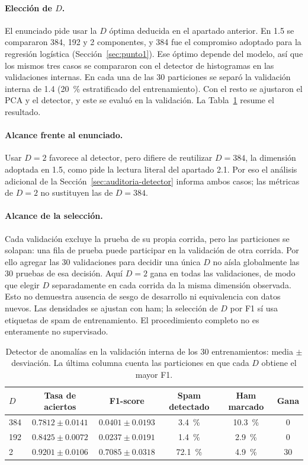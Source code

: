 \paragraph{Elección de $D$.} El enunciado pide usar la $D$ óptima deducida en
el apartado anterior. En 1.5 se compararon 384, 192 y 2 componentes, y 384
fue el compromiso adoptado para la regresión logística (Sección~\ref{sec:punto1}). Ese
óptimo depende del modelo, así que los mismos tres casos se compararon con el
detector de histogramas en las validaciones internas. En cada una de
las 30 particiones se separó la validación interna de 1.4 (20~\% estratificado
del entrenamiento). Con el resto se ajustaron el PCA y el detector, y este se
evaluó en la validación. La Tabla~\ref{tab:seleccion-d} resume el resultado.

\paragraph{Alcance frente al enunciado.} Usar $D=2$ favorece al detector,
pero difiere de reutilizar $D=384$, la dimensión adoptada en 1.5, como pide
la lectura literal del apartado 2.1. Por eso el análisis adicional de la
Sección~\ref{sec:auditoria-detector} informa ambos casos; las métricas de
$D=2$ no sustituyen las de $D=384$.

\paragraph{Alcance de la selección.} Cada validación excluye la prueba de
su propia corrida, pero las particiones se solapan: una fila de prueba puede
participar en la validación de otra corrida. Por ello agregar las 30
validaciones para decidir una única $D$ no aísla globalmente las 30 pruebas
de esa decisión. Aquí $D=2$ gana en todas las validaciones, de modo que elegir
$D$ separadamente en cada corrida da la misma dimensión observada. Esto no
demuestra ausencia de sesgo de desarrollo ni equivalencia con datos nuevos.
Las densidades se ajustan con ham; la selección de $D$ por F1 sí usa etiquetas
de spam de entrenamiento. El procedimiento completo no es enteramente
no supervisado.

\begin{table}[H]
    \centering
    \caption{Detector de anomalías en la validación interna de los 30
    entrenamientos: media $\pm$ desviación. La última columna cuenta las
    particiones en que cada $D$ obtiene el mayor F1.}
    \label{tab:seleccion-d}
    \small
    \begin{tabular}{lccccc}
        \toprule
        $D$ & Tasa de aciertos & F1-score & Spam detectado & Ham marcado & Gana \\
        \midrule
        384 & $0.7812\pm0.0141$ & $0.0401\pm0.0193$ & 3.4~\% & 10.3~\% & 0 \\
        192 & $0.8425\pm0.0072$ & $0.0237\pm0.0191$ & 1.4~\% & 2.9~\% & 0 \\
        2 & $0.9201\pm0.0106$ & $0.7085\pm0.0318$ & 72.1~\% & 4.9~\% & 30 \\
        \bottomrule
    \end{tabular}
\end{table}


